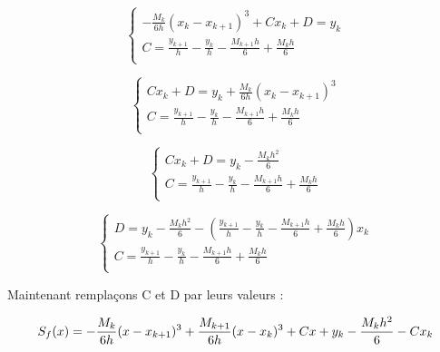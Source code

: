 \documentclass{article}
\begin{document}
\begin{enumerate}
\begin{enumerate}
    \begin{equation*}
      \left\{
      \begin{array}{l}
        - \frac{M_k}{6h} (x_k - x_{k + 1})^3 + Cx_k + D = y_k \\
        C = \frac{y_{k + 1}}{h} - \frac{y_k}{h} - \frac{M_{k
          + 1} h}{6} + \frac{M_k h}{6}\\
      \end{array}
      \right.
    \end{equation*}

    \begin{equation*}
      \left\{
      \begin{array}{l}
        C x_k + D = y_k + \frac{M_k}{6h} (x_k - x_{k + 1})^3\\
        C = \frac{y_{k + 1}}{h} - \frac{y_k}{h} - \frac{M_{k
          + 1} h}{6} + \frac{M_k h}{6}\\
      \end{array}
      \right.
    \end{equation*}

    \begin{equation*}
      \left\{
      \begin{array}{l}
        C x_k + D = y_k - \frac{M_k h^2}{6}\\
        C = \frac{y_{k + 1}}{h} - \frac{y_k}{h} - \frac{M_{k
          + 1} h}{6} + \frac{M_k h}{6}\\
      \end{array}
      \right.
    \end{equation*}

    \begin{equation*}
      \left\{
      \begin{array}{l}
        D = y_k - \frac{M_k h^2}{6} - (\frac{y_{k + 1}}{h} - \frac{y_k}{h} - \frac{M_{k
          + 1} h}{6} + \frac{M_k h}{6}) x_k\\
        C = \frac{y_{k + 1}}{h} - \frac{y_k}{h} - \frac{M_{k
          + 1} h}{6} + \frac{M_k h}{6}\\
      \end{array}
      \right.
    \end{equation*}

    Maintenant remplaçons C et D par leurs valeurs :

    \begin{equation*}
      S_f(x) = - \frac{M_k}{6h} (x - x_{k + 1})^3 + 
      \frac{M_{k + 1}}{6h} (x - x_k)^3 + C x + y_k - \frac{M_k h^2}{6} - C x_k\\
    \end{equation*}


\end{enumerate}
\end{enumerate}
\end{document}
